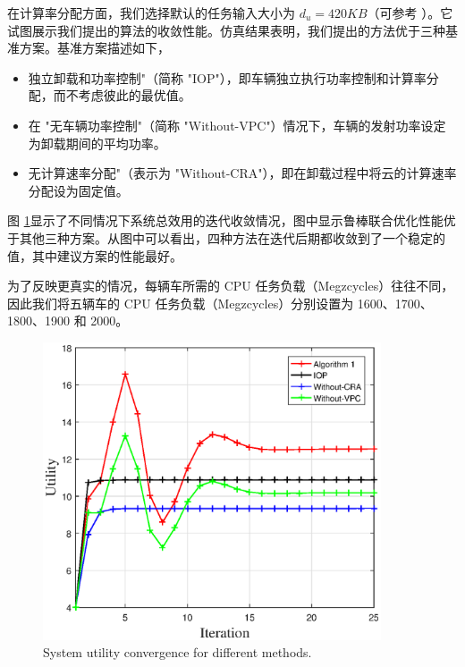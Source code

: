 在计算率分配方面，我们选择默认的任务输入大小为 $d_u=420KB$（可参考 \cite{Xu2015}）。它试图展示我们提出的算法的收敛性能。仿真结果表明，我们提出的方法优于三种基准方案。基准方案描述如下，
\begin{itemize}
\item[1)] 独立卸载和功率控制"（简称 "IOP"），即车辆独立执行功率控制和计算率分配，而不考虑彼此的最优值。
\item[2)] 在 "无车辆功率控制"（简称 "Without-VPC"）情况下，车辆的发射功率设定为卸载期间的平均功率。
\item[3)] 无计算速率分配"（表示为 "Without-CRA"），即在卸载过程中将云的计算速率分配设为固定值。
\end{itemize}

图 \ref{F7}显示了不同情况下系统总效用的迭代收敛情况，图中显示鲁棒联合优化性能优于其他三种方案。从图中可以看出，四种方法在迭代后期都收敛到了一个稳定的值，其中建议方案的性能最好。

为了反映更真实的情况，每辆车所需的 CPU 任务负载（Megzcycles）往往不同，因此我们将五辆车的 CPU 任务负载（Megzcycles）分别设置为 1600、1700、1800、1900 和 2000。

\begin{figure}[H]
\centering
\includegraphics[width=10cm]{figures//chap3//compare.eps}
\caption{System utility convergence for different methods.}
\label{F7}
\end{figure}

